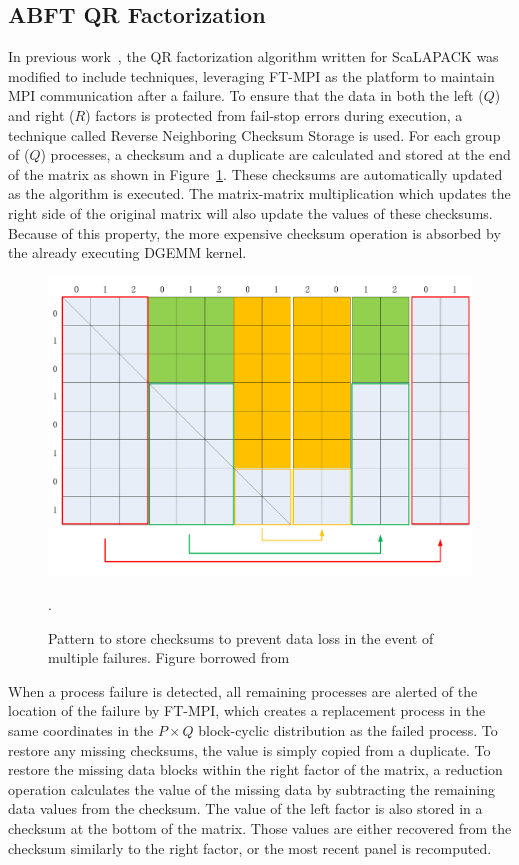 \subsection{ABFT QR Factorization}\label{subsect:cof:cofqr:abft}

In previous work~\cite{pengduppopp12}, the QR factorization algorithm written 
for ScaLAPACK was modified to include \abft techniques, leveraging FT-MPI as the 
platform to maintain MPI communication after a failure. To ensure that the data 
in both the left ($Q$) and right ($R$) factors is protected from fail-stop 
errors during execution, a technique called Reverse Neighboring Checksum Storage 
is used. For each group of ($Q$) processes, a checksum and a duplicate are 
calculated and stored at the end of the matrix as shown in 
Figure~\ref{fig:cof:checksum}. These checksums are automatically updated 
as the algorithm is executed. The matrix-matrix multiplication which updates the 
right side of the original matrix will also update the values of these 
checksums. Because of this property, the more expensive checksum operation is 
absorbed by the already executing DGEMM kernel.

\begin{figure}
	\centering
    \includegraphics[width=.8\linewidth]{figures/hybrid-chpt-2x3}
    \caption{Pattern to store checksums to prevent data loss in the event of multiple failures. Figure borrowed from~\cite{pengduppopp12}}.
    \label{fig:cof:checksum}
\end{figure}

When a process failure is detected, all remaining processes are alerted of the 
location of the failure by FT-MPI, which creates a replacement process in the 
same coordinates in the $P \times Q$ block-cyclic distribution as the failed 
process. To restore any missing checksums, the value is simply copied from a 
duplicate. To restore the missing data blocks within the right factor of the 
matrix, a reduction operation calculates the value of the missing data by 
subtracting the remaining data values from the checksum. The value of the left 
factor is also stored in a checksum at the bottom of the matrix. Those values 
are either recovered from the checksum similarly to the right factor, or the 
most recent panel is recomputed.

